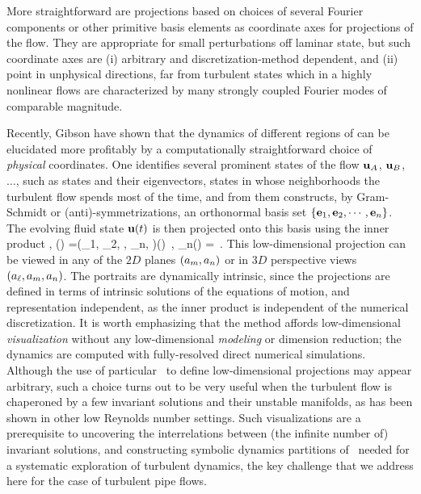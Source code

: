 More straightforward are projections based on choices of several Fourier
components %
or other primitive basis elements as
coordinate axes for projections of the flow. They are appropriate for
small perturbations off laminar state, but such coordinate axes are (i)
arbitrary and discretization-method dependent, and (ii) point in
unphysical directions, far from turbulent states which in a highly
nonlinear flows are characterized by  many strongly coupled Fourier modes
of comparable magnitude.

Recently, Gibson \etal{} have shown that the dynamics of different regions
of {\statesp} can be elucidated more profitably by a computationally
straight\-forward choice of \emph{physical} coordinates. One identifies
several prominent states of the flow ${\bf u}_A$, ${\bf u}_B$, $\dots$, such as
{\eqv} states and their eigenvectors, states in whose neighborhoods the
turbulent flow spends most of the time, and from them constructs, by
Gram-Schmidt or (anti)-symmetrizations, an orthonormal basis set
$\{{\bf e}_1, {\bf e}_2, \cdots, {\bf e}_n\}$. The evolving fluid state ${\bf u}(t)$
is then projected onto this basis using the inner product
,
\beq
\ssp(\zeit) =(\ssp_1, \ssp_2, \cdots, \ssp_n, \cdots)(\zeit)
    \,,\qquad
\ssp_n(\zeit) = 
\,.
This low-dimensional projection can be viewed in any of the $2D$ planes
$(a_m, a_n)$ or in $3D$ perspective views $(a_{\ell},a_m,
a_n)$.
The {\stateDsp} portraits are
{dynamically intrinsic}, since the projections are defined in terms of
intrinsic solutions of the equations of motion, and {representation
independent}, as the inner product  is independent of
the numerical discretization. It is worth emphasizing that the method
affords low-dimensional {\em visualization} without any low-dimensional
{\em modeling} or dimension reduction; the dynamics are computed with
fully-resolved direct numerical simulations. Although the use of
particular \reqva\ to define low-dimensional projections
may appear arbitrary, such a choice turns out to be
very useful when the turbulent flow is chaperoned by a few invariant
solutions and their unstable manifolds, as has been shown in other low
Reynolds number settings. Such visualizations are a
prerequisite to uncovering the interrelations between (the infinite
number of) invariant solutions, and constructing symbolic dynamics
partitions of \statesp\ needed for a systematic exploration of turbulent
dynamics, the key challenge that we address here for the case of turbulent
pipe flows.




